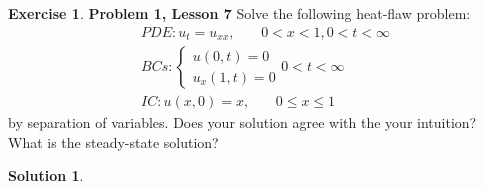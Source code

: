 \documentclass{article}
\theoremstyle{definition}
\newtheorem*{exer*}{Exercise}
\newtheorem*{sln*}{Solution}
\begin{document}
\begin{exer*}\textbf{Problem 1, Lesson 7}
	Solve the following heat-flaw problem:
	\begin{align*}
	&PDE: u_t = u_{xx},\,\,\,\,\,\,\,\,\,\,\, 0<x<1, 0<t<\infty\\
	&BCs:  
	\begin{cases}
	u(0,t) = 0\\
	u_x(1,t) = 0
	\end{cases} 0 < t < \infty\\
	&IC: u(x,0) = x,\,\,\,\,\,\,\,\,\,\,\, 0 \leq x\leq 1
	\end{align*}
	by separation of variables. Does your solution agree with the your intuition? What is the steady-state solution? 
	\begin{sln*}
		$\,$\\
		

\end{sln*}
\end{exer*}
\end{document}

